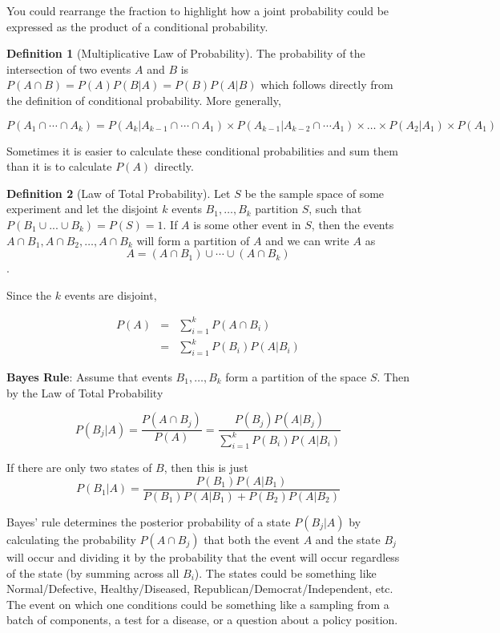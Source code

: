 \documentclass[
]{book}
\theoremstyle{definition}
\newtheorem{definition}{Definition}[chapter]
\theoremstyle{definition}
\theoremstyle{definition}
\theoremstyle{remark}
\begin{document}
You could rearrange the fraction to highlight how a joint probability could be expressed as the product of a conditional probability.

\begin{definition}[Multiplicative Law of Probability]
\protect\hypertarget{def:unnamed-chunk-68}{}{\label{def:unnamed-chunk-68} {} }
The probability of the intersection of two events \(A\) and \(B\) is \(P(A\cap B)=P(A)P(B|A)=P(B)P(A|B)\) which follows directly from the definition of conditional probability. More generally,

\[P(A_1\cap \cdots\cap A_k) = P(A_k| A_{k-1}\cap \cdots \cap A_1)\times P(A_{k-1}|A_{k-2}\cap \cdots A_1) \times \ldots \times P(A_2|A_1)\times P(A_1)\]

Sometimes it is easier to calculate these conditional probabilities and sum them than it is to calculate \(P(A)\) directly.
\end{definition}

\begin{definition}[Law of Total Probability]
\protect\hypertarget{def:unnamed-chunk-69}{}{\label{def:unnamed-chunk-69} {} }Let \(S\) be the sample space of some experiment and let the disjoint \(k\) events \(B_1,\ldots,B_k\) partition \(S\), such that \(P(B_1\cup ... \cup B_k) = P(S) = 1\). If \(A\) is some other event in \(S\), then the events \(A\cap B_1, A\cap B_2, \ldots, A\cap B_k\) will form a partition of \(A\) and we can write \(A\) as \[A=(A\cap B_1)\cup\cdots\cup (A\cap B_k)\].

Since the \(k\) events are disjoint,

\begin{eqnarray*}
P(A)&=&\sum\limits_{i=1}^k P(A \cap B_i)\\
      &=&\sum\limits_{i=1}^k P(B_i)P(A|B_i)
\end{eqnarray*}
\end{definition}

\textbf{Bayes Rule}: Assume that events \(B_1,\ldots,B_k\) form a partition of the space \(S\). Then by the Law of Total Probability

\[P(B_j|A)= \frac{P(A \cap B_j)} {P(A)} = \frac{P(B_j) P(A|B_j)}{\sum\limits_{i=1}^k P(B_i)P(A|B_i)}\]

If there are only two states of \(B\), then this is just
\[P(B_1|A)=\frac{P(B_1)P(A|B_1)} {P(B_1)P(A|B_1)+P(B_2)P(A|B_2)}\]

Bayes' rule determines the posterior probability of a state \(P(B_j|A)\) by calculating the probability \(P(A \cap B_j)\) that both the event \(A\) and the state \(B_j\) will occur and dividing it by the probability that the event will occur regardless of the state (by summing across all \(B_i\)). The states could be something like Normal/Defective, Healthy/Diseased, Republican/Democrat/Independent, etc. The event on which one conditions could be something like a sampling from a batch of components, a test for a disease, or a question about a policy position.
\end{document}
